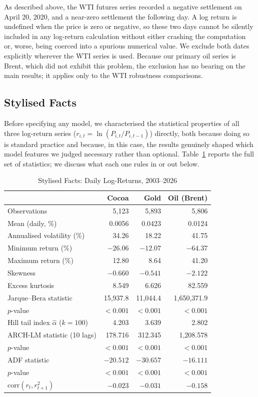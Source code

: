 \documentclass[preprint,12pt,authoryear]{elsarticle}
\begin{document}
As described above, the WTI futures series recorded a negative
settlement on April 20, 2020, and a near-zero settlement the following
day. A log return is undefined when the price is zero or negative, so
these two days cannot be silently included in any log-return
calculation without either crashing the computation or, worse, being
coerced into a spurious numerical value. We exclude both dates
explicitly wherever the WTI series is used. Because our primary oil
series is Brent, which did not exhibit this problem, the exclusion has
no bearing on the main results; it applies only to the WTI robustness
comparisons.

\subsection{Stylised Facts}
\label{sec:stylised}

Before specifying any model, we characterised the statistical
properties of all three log-return series
($r_{i,t} = \ln(P_{i,t}/P_{i,t-1})$) directly, both because doing so
is standard practice and because, in this case, the results
genuinely shaped which model features we judged necessary rather than
optional. Table~\ref{tab:stylised} reports the full set of statistics;
we discuss what each one rules in or out below.

\begin{table}[htbp]
\centering
\caption{Stylised Facts: Daily Log-Returns, 2003--2026}
\label{tab:stylised}
\small
\begin{tabular}{lrrr}
\toprule
& Cocoa & Gold & Oil (Brent) \\
\midrule
Observations & 5{,}123 & 5{,}893 & 5{,}806 \\
Mean (daily, \%) & 0.0056 & 0.0423 & 0.0124 \\
Annualised volatility (\%) & 34.26 & 18.22 & 41.75 \\
Minimum return (\%) & $-26.06$ & $-12.07$ & $-64.37$ \\
Maximum return (\%) & 12.80 & 8.64 & 41.20 \\
Skewness & $-0.660$ & $-0.541$ & $-2.122$ \\
Excess kurtosis & 8.549 & 6.626 & 82.559 \\
Jarque--Bera statistic & 15{,}937.8 & 11{,}044.4 & 1{,}650{,}371.9 \\
\quad $p$-value & $<0.001$ & $<0.001$ & $<0.001$ \\
Hill tail index $\hat{\alpha}$ ($k=100$) & 4.203 & 3.639 & 2.802 \\
ARCH-LM statistic (10 lags) & 178.716 & 312.345 & 1{,}208.578 \\
\quad $p$-value & $<0.001$ & $<0.001$ & $<0.001$ \\
ADF statistic & $-20.512$ & $-30.657$ & $-16.111$ \\
\quad $p$-value & $<0.001$ & $<0.001$ & $<0.001$ \\
$\mathrm{corr}(r_t, r^2_{t+1})$ & $-0.023$ & $-0.031$ & $-0.158$ \\
\bottomrule
\end{tabular}
\end{table}
\end{document}
